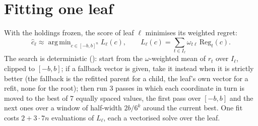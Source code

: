 \documentclass[11pt,a4paper]{article}
\newcommand{\code}[1]{\texttt{\detokenize{#1}}}
\DeclareMathOperator*{\argmin}{arg\,min}
\newcommand{\1}{\mathbf{1}}
\newcommand{\Reg}{\mathrm{Reg}}
\begin{document}
\section{Fitting one leaf}\label{sec:leaf}
With the holdings frozen, the score of leaf $\ell$ minimises its weighted regret:
\begin{equation}\label{eq:leaf}
\hat c_\ell\approx\argmin_{c\in[-b,b]^n}L_\ell(c),\qquad L_\ell(c)=\sum_{t\in I_\ell}\omega_{t\ell}\,\Reg_t(c).
\end{equation}
The search is deterministic (\code{_fit_leaf}): start from the $\omega$-weighted mean of $r_t$ over $I_\ell$, clipped to $[-b,b]$; if a fallback vector is given, take it instead when it is strictly better (the fallback is the refitted parent for a child, the leaf's own vector for a refit, none for the root); then run 3 passes in which each coordinate in turn is moved to the best of 7 equally spaced values, the first pass over $[-b,b]$ and the next ones over a window of half-width $2b/6^k$ around the current best. One fit costs $2+3\cdot7n$ evaluations of $L_\ell$, each a vectorised solve over the leaf.
\end{document}
